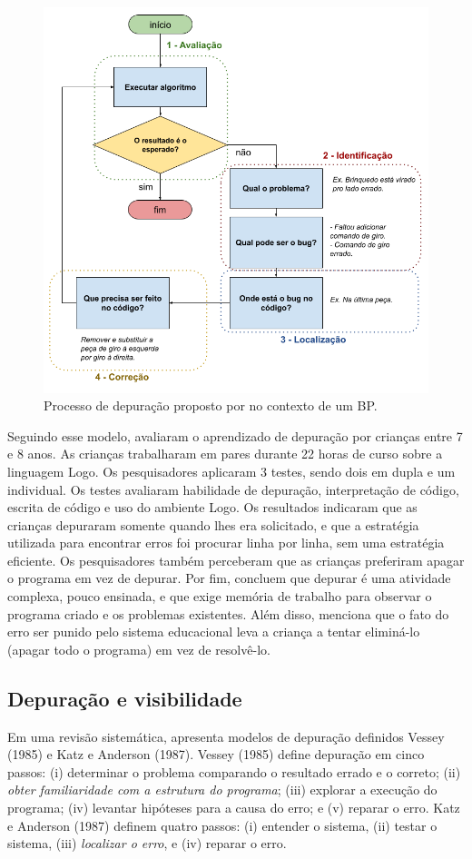 \begin{figure}[!htpb]
  \centering
  \includegraphics[width=.8\linewidth,fbox]{figs/ex_depuracao_carver_klar.png}
  \caption{Processo de depuração proposto por  no contexto de um BP. }
  \sourceauthor
  \label{fig_ex_carver_klar}
\end{figure}

Seguindo esse modelo,  avaliaram o aprendizado de depuração por crianças entre 7 e 8 anos. As crianças trabalharam em pares durante 22 horas de curso sobre a linguagem Logo. Os pesquisadores aplicaram 3 testes, sendo dois em dupla e um individual. Os testes avaliaram habilidade de depuração, interpretação de código, escrita de código e uso do ambiente Logo. Os resultados indicaram que as crianças depuraram somente quando lhes era solicitado, e que a estratégia utilizada para encontrar erros foi procurar linha por linha, sem uma estratégia eficiente. Os pesquisadores também perceberam que as crianças preferiram apagar o programa em vez de depurar. Por fim, concluem que depurar é uma atividade complexa, pouco ensinada, e que exige memória de trabalho para observar o programa criado e os problemas existentes. Além disso, menciona que o fato do erro ser punido pelo sistema educacional leva a criança a tentar eliminá-lo (apagar todo o programa) em vez de resolvê-lo.

\subsection{Depuração e visibilidade}
Em uma revisão sistemática,  apresenta modelos de depuração definidos Vessey (1985) e Katz e Anderson (1987). Vessey (1985) define depuração em cinco passos: (i) determinar o problema comparando o resultado errado e o correto; (ii) \textit{obter familiaridade com a estrutura do programa}; (iii) explorar a execução do programa; (iv) levantar hipóteses para a causa do erro; e (v) reparar o erro. Katz e Anderson (1987) definem quatro passos: (i) entender o sistema, (ii) testar o sistema, (iii) \textit{localizar o erro}, e (iv) reparar o erro.

